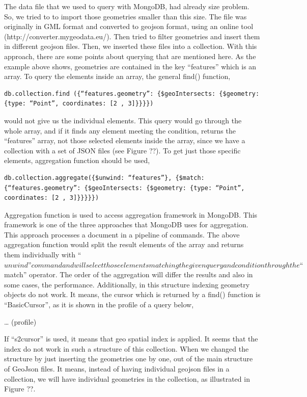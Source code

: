 \documentclass[a4paper,12pt]{article}
\begin{document}
The data file that we used to query with MongoDB, had already size problem. So, we tried to to import those geometries smaller than this size. The file was originally in GML format and converted to geojson format, using an online tool (http://converter.mygeodata.eu/). Then tried to filter geometries and insert them in different geojson files. Then, we inserted these files into a collection. With this approach, there are some points about querying that are mentioned here. As the example above shows, geometries are contained in the key “features” which is an array. To  query the elements inside an array, the general find() function,
\begin{verbatim}
db.collection.find ({“features.geometry”: {$geoIntersects: {$geometry: {type: “Point”, coordinates: [2 , 3]}}}})
\end{verbatim}
would not give us the individual elements. This query would go through the whole array, and if it finds any element meeting the condition, returns the “features” array, not those selected elements inside the array, since we have a collection with a set of JSON files (see Figure ??). To get just those specific elements, aggregation function should be used,
\begin{verbatim}
db.collection.aggregate({$unwind: “features”}, {$match: {“features.geometry”: {$geoIntersects: {$geometry: {type: “Point”, coordinates: [2 , 3]}}}}})
\end{verbatim}
Aggregation function is used to access aggregation framework in MongoDB. This framework is one of the three approaches that MongoDB uses for aggregation. This approach processes a document in a pipeline of commands. The above aggregation function would split the result elements of the array and returns them individually with “$unwind” command and will select those elements matching the given query and condition through the “$match” operator. The order of the aggregation will differ the results and also in some cases, the performance.
Additionally, in this structure indexing geometry objects do not work. It means, the cursor which is returned by a find() function is “BasicCursor”, as it is shown in the profile of a query below,

… (profile)

If “s2cursor” is used, it means that geo spatial index is applied. It seems that the index do not work in such a structure of this collection. When we changed the structure by just inserting the geometries one by one, out of the main structure of GeoJson files. It means, instead of having individual geojson files in a collection, we will have individual geometries in the collection, as illustrated in Figure ??.
\end{document}
